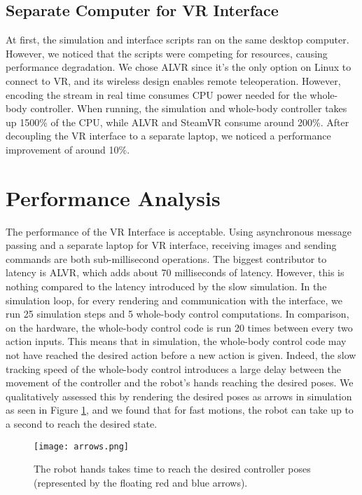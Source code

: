 \subsection{Separate Computer for VR Interface}

At first, the simulation and interface scripts ran on the same desktop computer. However, we noticed that the scripts were competing for resources, causing performance degradation. We chose ALVR since it's the only option on Linux to connect to VR, and its wireless design enables remote teleoperation. However, encoding the stream in real time consumes CPU power needed for the whole-body controller. When running, the simulation and whole-body controller takes up 1500\% of the CPU, while ALVR and SteamVR consume around 200\%. After decoupling the VR interface to a separate laptop, we noticed a performance improvement of around 10\%.

\section{Performance Analysis}
The performance of the VR Interface is acceptable. Using asynchronous message passing and a separate laptop for VR interface, receiving images and sending commands are both sub-millisecond operations. The biggest contributor to latency is ALVR, which adds about 70 milliseconds of latency. However, this is nothing compared to the latency introduced by the slow simulation. In the simulation loop, for every rendering and communication with the interface, we run 25 simulation steps and 5 whole-body control computations. In comparison, on the hardware, the whole-body control code is run 20 times between every two action inputs. This means that in simulation, the whole-body control code may not have reached the desired action before a new action is given. Indeed, the slow tracking speed of the whole-body control introduces a large delay between the movement of the controller and the robot's hands reaching the desired poses. We qualitatively assessed this by rendering the desired poses as arrows in simulation as seen in Figure \ref{fig:arrows}, and we found that for fast motions, the robot can take up to a second to reach the desired state. 
\begin{figure}
	\centering
	\texttt{[image: arrows.png]}
	\caption{The robot hands takes time to reach the desired controller poses (represented by the floating red and blue arrows).}
    \label{fig:arrows}
\end{figure}

